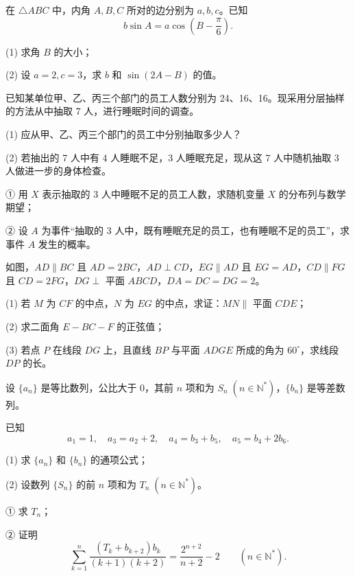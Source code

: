 \begin{question}
在 $\triangle ABC$ 中，内角 $A,B,C$ 所对的边分别为 $a,b,c$。已知
\nopagebreak[4]
\[
b\sin A=a\cos\left(B-\frac\pi6\right).
\]

(1) 求角 $B$ 的大小；

(2) 设 $a=2,c=3$，求 $b$ 和 $\sin(2A-B)$ 的值。

\end{question}
\begin{question}
已知某单位甲、乙、丙三个部门的员工人数分别为 24、16、16。现采用分层抽样的方法从中抽取 7 人，进行睡眠时间的调查。

(1) 应从甲、乙、丙三个部门的员工中分别抽取多少人？

(2) 若抽出的 7 人中有 4 人睡眠不足，3 人睡眠充足，现从这 7 人中随机抽取 3 人做进一步的身体检查。

① 用 $X$ 表示抽取的 3 人中睡眠不足的员工人数，求随机变量 $X$ 的分布列与数学期望；

② 设 $A$ 为事件“抽取的 3 人中，既有睡眠充足的员工，也有睡眠不足的员工”，求事件 $A$ 发生的概率。

\Needspace{0.4\textheight}
\end{question}
\begin{question}
如图，$AD\parallel BC$ 且 $AD=2BC$，$AD\perp CD$，$EG\parallel AD$ 且 $EG=AD$，$CD\parallel FG$ 且 $CD=2FG$，$DG\perp$ 平面 $ABCD$，$DA=DC=DG=2$。

(1) 若 $M$ 为 $CF$ 的中点，$N$ 为 $EG$ 的中点，求证：$MN\parallel$ 平面 $CDE$；

(2) 求二面角 $E-BC-F$ 的正弦值；

(3) 若点 $P$ 在线段 $DG$ 上，且直线 $BP$ 与平面 $ADGE$ 所成的角为 $60^\circ$，求线段 $DP$ 的长。
\nopagebreak[4]
\begin{center}\end{center}
\nopagebreak[4]
\end{question}
\begin{question}
设 $\{a_n\}$ 是等比数列，公比大于 0，其前 $n$ 项和为 $S_n\;(n\in\mathbb N^*)$，$\{b_n\}$ 是等差数列。

已知
\nopagebreak[4]
\[
a_1=1,\quad a_3=a_2+2,\quad a_4=b_3+b_5,\quad a_5=b_4+2b_6.
\]

(1) 求 $\{a_n\}$ 和 $\{b_n\}$ 的通项公式；

(2) 设数列 $\{S_n\}$ 的前 $n$ 项和为 $T_n\;(n\in\mathbb N^*)$。

① 求 $T_n$；

② 证明
\nopagebreak[4]
\[
\sum_{k=1}^{n}\frac{(T_k+b_{k+2})b_k}{(k+1)(k+2)}=\frac{2^{n+2}}{n+2}-2\qquad(n\in\mathbb N^*).
\]

\end{question}
